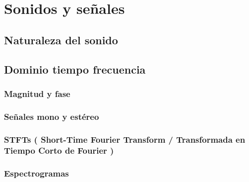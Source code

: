 \documentclass[a4paper,11pt]{memoir}
\begin{document}
\section{Sonidos y señales}
\subsection{Naturaleza del sonido}

%
%
%
\subsection{Dominio tiempo frecuencia}

\subsubsection{Magnitud y fase}

\subsubsection{Señales mono y estéreo}

\subsubsection{STFTs ( Short-Time Fourier Transform / Transformada en Tiempo Corto de Fourier )} \label{sec:stft}

\clearpage
\subsubsection{Espectrogramas}

\end{document}
